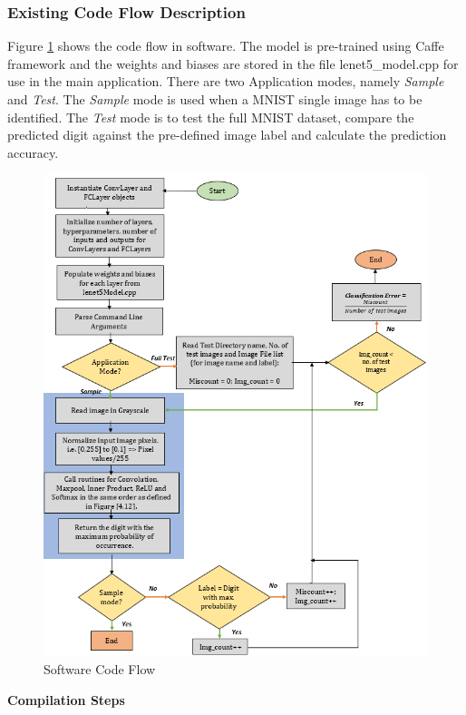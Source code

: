 \subsubsection{Existing Code Flow Description}
\label{4_1_2_2}
Figure \ref{fig:CPP_flow_lenet5} shows the code flow in software. The model is pre-trained using Caffe framework and the weights and biases are stored in the file lenet5\_model.cpp for use in the main application.\newline
There are two Application modes, namely \textit{Sample} and \textit{Test}. The \textit{Sample} mode is used when a MNIST single image has to be identified. The \textit{Test} mode is to test the full MNIST dataset, compare the predicted digit against the pre-defined image label and calculate the prediction accuracy.\newline\newline
\begin{figure}[h!]
\centering
\includegraphics[width=\linewidth]{figures/CPP_flow_lenet5.png}
\caption{Software Code Flow
\cite{papaa-opencl}}
\label{fig:CPP_flow_lenet5}
\end{figure}\textbf{Compilation Steps \cite{papaa-opencl}} \newline\newline
